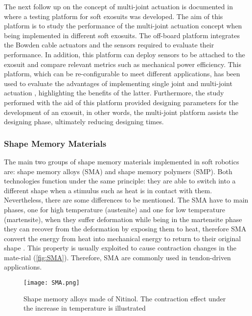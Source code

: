 The next follow up on the concept of multi-joint actuation is documented in \cite{Ding2014} where a testing platform for soft exosuits was developed. The aim of this platform is to study the performance of the multi-joint actuation concept when being implemented in different soft exosuits. The off-board platform integrates the Bowden cable actuators and the sensors required to evaluate their performance. In addition, this platform can deploy sensors to be attached to the exosuit and compare relevant metrics such as mechanical power efficiency. This platform, which can be re-configurable to meet different applications, has been used to evaluate the advantages of implementing single joint and multi-joint actuation \cite{Ding2016}, highlighting the benefits of the latter. Furthermore, the study performed with the aid of this platform provided designing parameters for the development of an exosuit, in other words, the multi-joint platform assists the designing phase, ultimately reducing designing times.

\subsubsection{Shape Memory Materials}

The main two groups of shape memory materials implemented in soft robotics are: shape memory alloys (SMA) and shape memory polymers (SMP). Both technologies function under the same principle: they are able to switch into a different shape when a stimulus such as heat is in contact with them. Nevertheless, there are some differences to be mentioned. The SMA have to main phases, one for high temperature (austenite) and one for low temperature (martensite), when they suffer deformation while being in the martensite phase they can recover from the deformation by exposing them to heat, therefore SMA convert the energy from heat into mechanical energy to return to their original shape \cite{ImagesScientificInstrument2016}. This property is usually exploited to cause contraction changes in the mate-rial (\autoref{fig:SMA}). Therefore, SMA are commonly used in tendon-driven applications.
\begin{figure}[hbtp!]
    \centering
    \texttt{[image: SMA.png]}
    \caption{Shape memory alloys made of Nitinol. The contraction effect under the increase in temperature is illustrated \cite{ImagesScientificInstrument2016} }
    \label{fig:SMA}
\end{figure}

